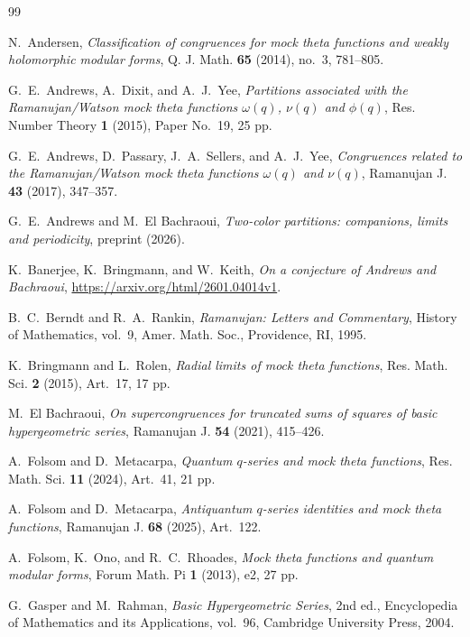\documentclass[reqno]{amsart}
\theoremstyle{definition}
\theoremstyle{plain}
\theoremstyle{remark}
\numberwithin{equation}{section}
\begin{document}
\begin{thebibliography}{99}


N.~Andersen,
\emph{Classification of congruences for mock theta functions and weakly holomorphic modular forms},
Q. J. Math. \textbf{65} (2014), no.~3, 781--805.

G.~E.~Andrews, A.~Dixit, and A.~J.~Yee,
\emph{Partitions associated with the Ramanujan/Watson mock theta functions $\omega(q)$, $\nu(q)$ and $\phi(q)$},
Res. Number Theory \textbf{1} (2015), Paper No.~19, 25 pp.


G.~E.~Andrews, D.~Passary, J.~A.~Sellers, and A.~J.~Yee,
\emph{Congruences related to the Ramanujan/Watson mock theta functions $\omega(q)$ and $\nu(q)$},
Ramanujan J. \textbf{43} (2017), 347--357.

G.~E.~Andrews and M.~El Bachraoui,
\emph{Two-color partitions: companions, limits and periodicity},
preprint (2026).

K.~Banerjee, K.~Bringmann, and W.~Keith,
\emph{On a conjecture of Andrews and Bachraoui},
\url{https://arxiv.org/html/2601.04014v1}.


B.~C.~Berndt and R.~A.~Rankin,
\emph{Ramanujan: Letters and Commentary},
History of Mathematics, vol.~9, Amer. Math. Soc., Providence, RI, 1995.

K.~Bringmann and L.~Rolen,
\emph{Radial limits of mock theta functions},
Res. Math. Sci. \textbf{2} (2015), Art.~17, 17 pp.

M.~El Bachraoui,
\emph{On supercongruences for truncated sums of squares of basic hypergeometric series},
Ramanujan J. \textbf{54} (2021), 415--426.


A.~Folsom and D.~Metacarpa,
\emph{Quantum $q$-series and mock theta functions},
Res. Math. Sci. \textbf{11} (2024), Art.~41, 21 pp.

A.~Folsom and D.~Metacarpa,
\emph{Antiquantum $q$-series identities and mock theta functions},
Ramanujan J. \textbf{68} (2025), Art.~122.

A.~Folsom, K.~Ono, and R.~C.~Rhoades,
\emph{Mock theta functions and quantum modular forms},
Forum Math. Pi \textbf{1} (2013), e2, 27 pp.

G.~Gasper and M.~Rahman,
\emph{Basic Hypergeometric Series}, 2nd ed., Encyclopedia of Mathematics and its Applications,
vol.~96, Cambridge University Press, 2004.


\end{thebibliography}
\end{document}
